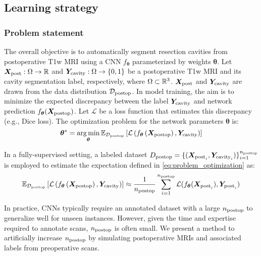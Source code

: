 \subsection{Learning strategy}
\label{sec:learning_strategy}


\subsubsection{Problem statement}

\newcommand{\loss}{\mathcal{L}}
\newcommand{\expec}{\mathbb{E}}
\newcommand{\exppost}{\expec_{\Dom\post}}

The overall objective is to automatically segment resection cavities from postoperative \ac{T1w} \ac{MRI} using a \ac{CNN} $f_{\bm{\theta}}$ parameterized by weights $\bm{\theta}$.
Let $\bm{X}_{\text{post}} : \Omega \to \mathbb{R}$ and $\bm{Y}_{\text{cavity}}  : \Omega \to \{ 0, 1 \}$ be a postoperative \ac{T1w} \ac{MRI} and its cavity segmentation label, respectively, where $\Omega \subset \mathbb{R}^3$.
$\bm{X}_{\text{post}}$ and $\bm{Y}_{\text{cavity}}$ are drawn from the data distribution $\mathcal{D}_{\text{postop}}$.
In model training, the aim is to minimize the expected discrepancy between the label $\bm{Y}_{\text{cavity}}$ and network prediction $f_{\bm{\theta}}(\bm{X}_{\text{postop}})$.
Let $\loss$ be a loss function that estimates this discrepancy (e.g., Dice loss).
The optimization problem for the network parameters $\bm{\theta}$ is:
\begin{equation}
  \bm{\theta}^* =
  \argmin_{\bm{\theta}}
  \exppost \left[
    \loss \left(
      f_{\bm{\theta}} \left( \X\post \right),
      \Y\cav
    \right)
  \right]
  \label{eq:problem_optimization}
\end{equation}


In a fully-supervised setting, a labeled dataset $D_{\text{postop}} = \{ (\bm{X}_{\text{post}_i}, \bm{Y}_{\text{cavity}_i}) \}_{i = 1}^{n_{\text{postop}}}$ is employed to estimate the expectation defined in \cref{eq:problem_optimization} as:
\begin{equation}
  \exppost \left[
    \loss \left(
      f_{\bm{\theta}} \left( \X\post \right), \Y\cav
    \right)
  \right]
  \approx \frac{1}{n\post} \sum_{i=1}^{n\post} \loss(f_{\bm{\theta}}(\X_{\text{post}_i}), \Y_{\text{post}_i})
  \label{eq:problem_optimization_fully}
\end{equation}

In practice, \acp{CNN} typically require an annotated dataset with a large $n_{\text{postop}}$ to generalize well for unseen instances.
However, given the time and expertise required to annotate scans, $n_{\text{postop}}$ is often small.
We present a method to artificially increase $n_{\text{postop}}$ by simulating postoperative \acp{MRI} and associated labels from preoperative scans.


